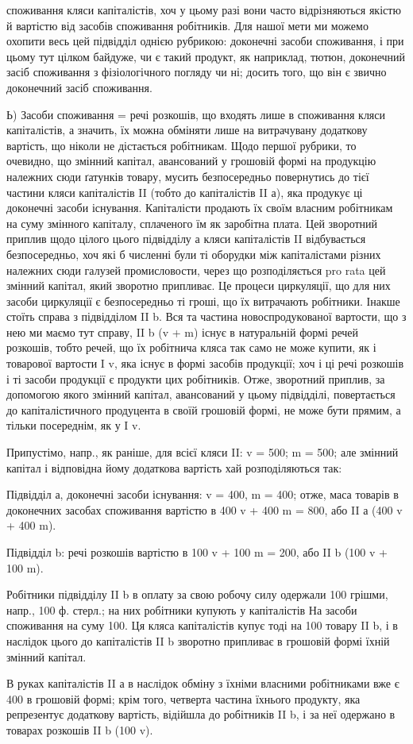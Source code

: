 споживання кляси капіталістів, хоч у цьому разі вони часто відрізняються
якістю й вартістю від засобів споживання робітників. Для нашої мети
ми можемо охопити весь цей підвідділ однією рубрикою: доконечні
засоби споживання, і при цьому тут цілком байдуже, чи є такий продукт,
як наприклад, тютюн, доконечний засіб споживання з фізіологічного
погляду чи ні; досить того, що він є звично доконечний засіб споживання.

Ь) Засоби споживання = речі розкошів, що входять лише в
споживання кляси капіталістів, а значить, їх можна обміняти лише на
витрачувану додаткову вартість, що ніколи не дістається робітникам.
Щодо першої рубрики, то очевидно, що змінний капітал, авансований у
грошовій формі на продукцію належних сюди ґатунків товару, мусить
безпосередньо повернутись до тієї частини кляси капіталістів II (тобто
до капіталістів II а), яка продукує ці доконечні засоби існування. Капіталісти
продають їх своїм власним робітникам на суму змінного капіталу,
сплаченого їм як заробітна плата. Цей зворотний приплив щодо цілого
цього підвідділу а кляси капіталістів II відбувається безпосередньо,
хоч які б численні були ті оборудки між капіталістами різних належних
сюди галузей промисловости, через що розподіляється pro rata
цей змінний капітал, який зворотно припливає. Це процеси циркуляції,
що для них засоби циркуляції є безпосередньо ті гроші, що їх витрачають
робітники. Інакше стоїть справа з підвідділом II b. Вся та частина
новоспродукованої вартости, що з нею ми маємо тут справу, II b (v + m)
існує в натуральній формі речей розкошів, тобто речей, що їх робітнича
кляса так само не може купити, як і товарової вартости I v, яка існує
в формі засобів продукції; хоч і ці речі розкошів і ті засоби продукції
є продукти цих робітників. Отже, зворотний приплив, за допомогою
якого змінний капітал, авансований у цьому підвідділі, повертається до
капіталістичного продуцента в своїй грошовій формі, не може бути
прямим, а тільки посереднім, як у I v.

Припустімо, напр., як раніше, для всієї кляси II: v = 500; m = 500;
але змінний капітал і відповідна йому додаткова вартість хай розподіляються
так:

Підвідділ а, доконечні засоби існування: v = 400, m = 400; отже,
маса товарів в доконечних засобах споживання вартістю в 400 v + 400 m
= 800, або II а (400 v + 400 m).

Підвідділ b: речі розкошів вартістю в 100 v + 100 m = 200, або
II b (100 v + 100 m).

Робітники підвідділу II b в оплату за свою робочу силу одержали
100 грішми, напр., 100 ф. стерл.; на них робітники купують у капіталістів
На засоби споживання на суму 100. Ця кляса капіталістів купує
тоді на 100 товару II b, і в наслідок цього до капіталістів II b зворотно
припливає в грошовій формі їхній змінний капітал.

В руках капіталістів II а в наслідок обміну з їхніми власними робітниками
вже є 400 в грошовій формі; крім того, четверта частина їхнього
продукту, яка репрезентує додаткову вартість, відійшла до робітників
II b, і за неї одержано в товарах розкошів II b (100 v).
